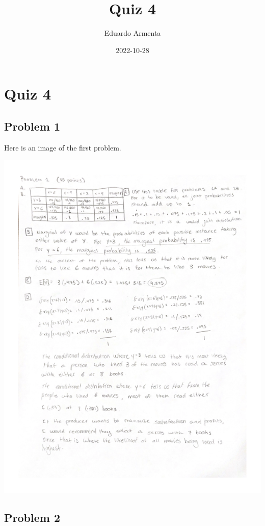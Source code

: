 \documentclass[
]{article}
\title{Quiz 4}
\author{Eduardo Armenta}
\date{2022-10-28}
\begin{document}
\maketitle

\hypertarget{quiz-4}{%
\section{Quiz 4}\label{quiz-4}}

\hypertarget{problem-1}{%
\subsection{Problem 1}\label{problem-1}}

Here is an image of the first problem.

\includegraphics{./Q1.png}

\hypertarget{problem-2}{%
\subsection{Problem 2}\label{problem-2}}
\end{document}
